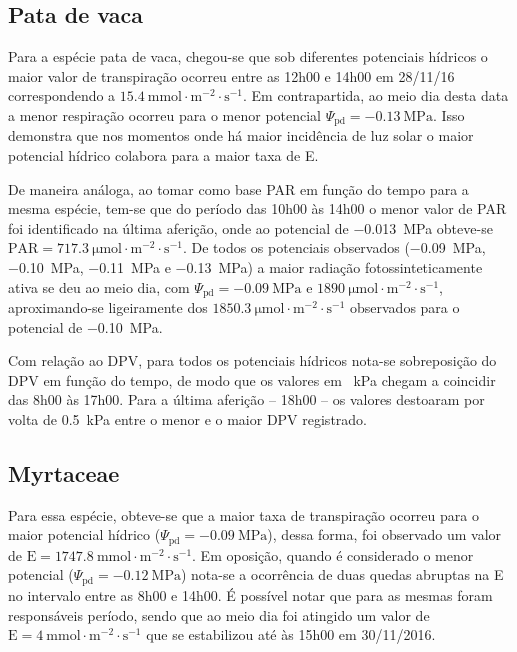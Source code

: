 \documentclass[a4paper, 12pt]{article}
\numberwithin{equation}{section}
\begin{document}
	\subsection{Pata de vaca}
	Para a espécie pata de vaca, chegou-se que sob diferentes potenciais hídricos o maior valor de transpiração ocorreu entre as 12h00 e 14h00 em 28/11/16 correspondendo a $\SI{15.4}{\milli\mole\cdot\meter^{-2}\cdot\second^{-1}}$. Em contrapartida, ao meio dia desta data a menor respiração ocorreu para o menor potencial $\Psi_{\textrm{pd}}=\SI{-0.13}{\mega\pascal}$. Isso demonstra que nos momentos onde há maior incidência de luz solar o maior potencial hídrico colabora para a maior taxa de E.
	
	De maneira análoga, ao tomar como base PAR em função do tempo para a mesma espécie, tem-se que do período das 10h00 às 14h00 o menor valor de PAR foi identificado na última aferição, onde ao potencial de \SI{-.013}{\mega\pascal} obteve-se $\textrm{PAR}=\SI{717.3}{\micro\mole\cdot\meter^{-2}\cdot\second^{-1}}$. De todos os potenciais observados (\SI{-.09}{\mega\pascal}, \SI{-.10}{\mega\pascal}, \SI{-.11}{\mega\pascal} e \SI{-.13}{\mega\pascal}) a maior radiação fotossinteticamente ativa se deu ao meio dia, com $\Psi_{\textrm{pd}}=\SI{-0.09}{\mega\pascal}$ e $\SI{1890}{\micro\mole\cdot\meter^{-2}\cdot\second^{-1}}$, aproximando-se ligeiramente dos $\SI{1850.3}{\micro\mole\cdot\meter^{-2}\cdot\second^{-1}}$ observados para o potencial de \SI{-.10}{\mega\pascal}.
	
	Com relação ao DPV, para todos os potenciais hídricos nota-se sobreposição do DPV em função do tempo, de modo que os valores em \SI{}{\kilo\pascal} chegam a coincidir das 8h00 às 17h00. Para a última aferição -- 18h00 -- os valores destoaram por volta de \SI{0.5}{\kilo\pascal} entre o menor e o maior DPV registrado.
	
	\subsection{Myrtaceae}
	
	Para essa espécie, obteve-se que a maior taxa de transpiração ocorreu para o maior potencial hídrico ($\Psi_{\textrm{pd}}=\SI{-0.09}{\mega\pascal}$), dessa forma, foi observado um valor de $\textrm{E}=\SI{1747.8}{\milli\mole\cdot\meter^{-2}\cdot\second^{-1}}$. Em oposição, quando é considerado o menor potencial ($\Psi_{\textrm{pd}}=\SI{-0.12}{\mega\pascal}$) nota-se a ocorrência de duas quedas abruptas na E no intervalo entre as 8h00 e 14h00. É possível notar que para as mesmas foram responsáveis período, sendo que ao meio dia foi atingido um valor de $\textrm{E}=\SI{4}{\milli\mole\cdot\meter^{-2}\cdot\second^{-1}}$ que se estabilizou até às 15h00 em 30/11/2016.
	
\end{document}
